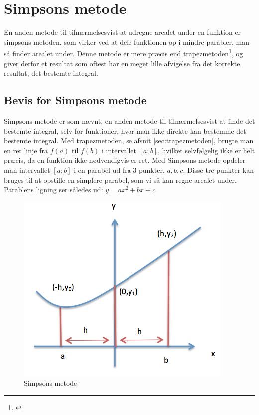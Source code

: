\documentclass[12pt]{article}
\numberwithin{equation}{section}
\begin{document}
\section{Simpsons metode}
\label{sec:simpsonsmetode}
En anden metode til tilnærmelsesvist at udregne arealet under en funktion er simpsons-metoden, som virker ved at dele funktionen op i mindre parabler, man så finder arealet under. Denne metode er mere præcis end trapezmetoden\footnote{\cite[side 15]{2012matA}}, og giver derfor et resultat som oftest har en meget lille afvigelse fra det korrekte resultat, det bestemte integral.
\subsection{Bevis for Simpsons metode}
Simpsons metode er som nævnt, en anden metode til tilnærmelsesvist at finde det bestemte integral, selv for funktioner, hvor man ikke direkte kan bestemme det bestemte integral. Med trapezmetoden, se afsnit \ref{sec:trapezmetoden}, brugte man en ret linje fra $f(a)$ til $f(b)$ i intervallet $[a;b]$, hvilket selvfølgelig ikke er helt præcis, da en funktion ikke nødvendigvis er ret. Med Simpsons metode opdeler man intervallet $[a;b]$ i en parabel ud fra 3 punkter, $a,b,c$. Disse tre punkter kan bruges til at opstille en simplere parabel, som vi så kan regne arealet under. Parablens ligning ser således ud: $y=ax^2+bx+c$
\begin{figure}[H]
\centering
\includegraphics[width=0.6\linewidth]{Billeder/Simpsonsmetode}
\caption{Simpsons metode}
\label{fig:simpsonsmetode}
\end{figure}
\end{document}
